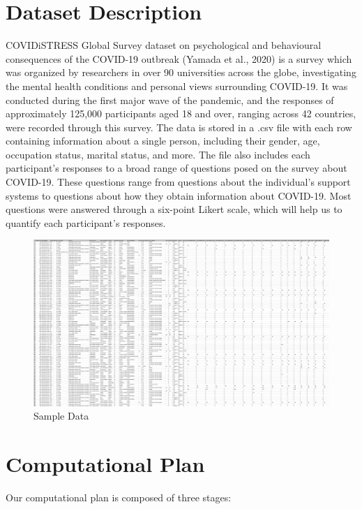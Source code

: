 \documentclass[fontsize=11pt]{article}
\begin{document}
    \section*{Dataset Description}

    COVIDiSTRESS Global Survey dataset on psychological and behavioural consequences of the COVID-19 outbreak (Yamada et al., 2020) is a survey which was organized by researchers in over 90 universities across the globe, investigating the mental health conditions and personal views surrounding COVID-19. It was conducted during the first major wave of the pandemic, and the responses of approximately 125,000 participants aged 18 and over, ranging across 42 countries, were recorded through this survey. The data is stored in a .csv file with each row containing information about a single person, including their gender, age, occupation status, marital status, and more. The file also includes each participant's responses to a broad range of questions posed on the survey about COVID-19. These questions range from questions about the individual’s support systems to questions about how they obtain information about COVID-19. Most questions were answered through a six-point Likert scale, which will help us to quantify each participant’s responses.

    \begin{figure}
        \centering
        \includegraphics[width=\textwidth]{img/SampleData.png}
        \caption{Sample Data}
        \label{fig:my_label}
    \end{figure}

    \section*{Computational Plan}

    Our computational plan is composed of three stages:
\end{document}
